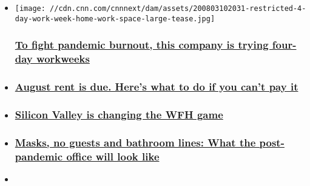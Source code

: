 \begin{itemize}
\item
  \href{/2020/08/04/success/four-day-workweek-pandemic-burnout/index.html}{}

  \texttt{[image: //cdn.cnn.com/cnnnext/dam/assets/200803102031-restricted-4-day-work-week-home-work-space-large-tease.jpg]}

  \hypertarget{to-fight-pandemic-burnout-this-company-is-trying-four-day-workweeks}{%
  \subsubsection{\texorpdfstring{\href{/2020/08/04/success/four-day-workweek-pandemic-burnout/index.html}{To
  fight pandemic burnout, this company is trying four-day
  workweeks}}{To fight pandemic burnout, this company is trying four-day workweeks}}\label{to-fight-pandemic-burnout-this-company-is-trying-four-day-workweeks}}
\item
  \hypertarget{august-rent-is-due-heres-what-to-do-if-you-cant-pay-it}{%
  \subsubsection{\texorpdfstring{\href{/2020/07/31/success/rent-is-due-august-1/index.html}{August
  rent is due. Here's what to do if you can't pay
  it}}{August rent is due. Here's what to do if you can't pay it}}\label{august-rent-is-due-heres-what-to-do-if-you-cant-pay-it}}
\item
  \hypertarget{silicon-valley-is-changing-the-wfh-game}{%
  \subsubsection{\texorpdfstring{\href{/2020/07/28/success/google-permanent-remote-work/index.html}{Silicon
  Valley is changing the WFH
  game}}{Silicon Valley is changing the WFH game}}\label{silicon-valley-is-changing-the-wfh-game}}
\item
  \hypertarget{masks-no-guests-and-bathroom-lines-what-the-post-pandemic-office-will-look-like}{%
  \subsubsection{\texorpdfstring{\href{/2020/07/27/success/back-to-work-plans-during-pandemic-challenger/index.html}{Masks,
  no guests and bathroom lines: What the post-pandemic office will look
  like}}{Masks, no guests and bathroom lines: What the post-pandemic office will look like}}\label{masks-no-guests-and-bathroom-lines-what-the-post-pandemic-office-will-look-like}}
\item
  \hypertarget{why-googles-new-wfh-plan-is-a-game-changer}{%
}
\end{itemize}
